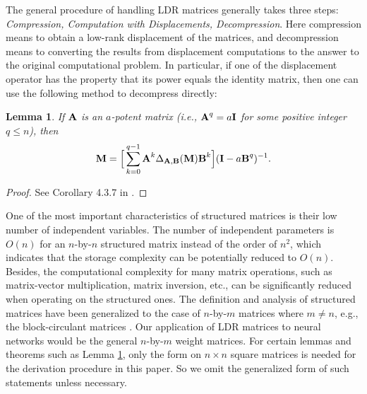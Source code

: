 \documentclass{article}
\newtheorem{lemma}{Lemma}[section]
\begin{document}
The general procedure of handling LDR matrices generally takes three steps: \textit{Compression, Computation with Displacements, Decompression}.
Here compression means to obtain a low-rank displacement of the matrices, and decompression means to converting the results from displacement computations to the answer to the original computational problem. In particular, if one of the displacement operator has the property that its power equals the identity matrix, then one can use the following method to decompress directly:
\begin{lemma}
\label{ldisp}
If $\textrm{\bf{A}}$ is an $a$-potent matrix (i.e., $\textrm{\bf{A}}^q=a\textrm{\bf{I}}$ for some positive integer $q\le n$), then
\begin{equation}
\textrm{\bf{M}} = \Big[\sum_{k=0}^{q-1}\textrm{\bf{A}}^k\Delta_{\textrm{\bf{A}},\textrm{\bf{B}}}(\textrm{\bf{M}})\textrm{\bf{B}}^k\Big](\textrm{\bf{I}} - a\textrm{\bf{B}}^q)^{-1}.
\end{equation}
\end{lemma}
\begin{proof}
See Corollary 4.3.7 in \cite{bini2012polynomial}.
\end{proof}

One of the most important characteristics of structured matrices is their low number of independent variables. The number of independent parameters is $O(n)$ for an $n$-by-$n$ structured matrix instead of the order of $n^2$, which indicates that the storage complexity can be potentially reduced to $O(n)$. Besides, the computational complexity for many matrix operations, such as matrix-vector multiplication, matrix inversion, etc., can be significantly reduced when operating on the structured ones. The definition and analysis of structured matrices have been generalized to the case of $n$-by-$m$ matrices where $m\neq n$, e.g., the block-circulant matrices \cite{pan2015estimating}. Our application of LDR matrices to neural networks would be the general $n$-by-$m$ weight matrices. For certain lemmas and theorems such as Lemma \ref{ldisp}, only the form on $n\times n$ square matrices is needed for the derivation procedure in this paper. So we omit the generalized form of such statements unless necessary.
\end{document}
